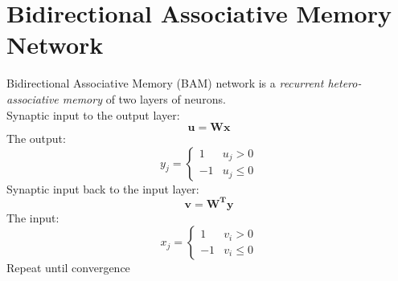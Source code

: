 \section{Bidirectional Associative Memory Network}
Bidirectional Associative Memory (BAM) network is a \emph{recurrent hetero-associative memory} of two layers of neurons. \\
Synaptic input to the output layer:
$$\mathbf{u = Wx}$$
The output:
$$
y_j = 
\begin{cases}
1 & u_j > 0 \\
-1 & u_j \le 0
\end{cases}
$$
Synaptic input back to the input layer:
$$\mathbf{v = W^{T} y}$$
The input:
$$
x_j = 
\begin{cases}
1 & v_i > 0 \\
-1 & v_i \le 0
\end{cases}
$$
Repeat until convergence